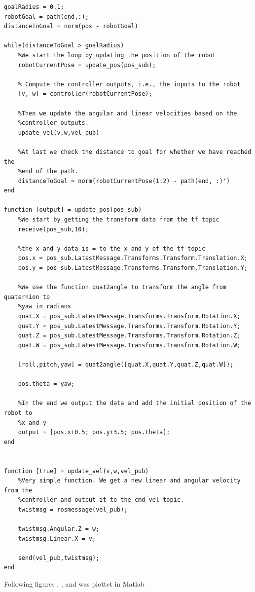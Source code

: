 \documentclass[12pt,a4paper]{article}
\begin{document}
\begin{lstlisting}[style=Matlab-editor]
%defining the radius, endpoint and initializing distanceToGoal
goalRadius = 0.1;
robotGoal = path(end,:);
distanceToGoal = norm(pos - robotGoal)

while(distanceToGoal > goalRadius)   
	%We start the loop by updating the position of the robot
	robotCurrentPose = update_pos(pos_sub);
	
	% Compute the controller outputs, i.e., the inputs to the robot
	[v, w] = controller(robotCurrentPose);
	
	%Then we update the angular and linear velocities based on the
	%controller outputs.
	update_vel(v,w,vel_pub)
	
	%At last we check the distance to goal for whether we have reached the
	%end of the path.
	distanceToGoal = norm(robotCurrentPose(1:2) - path(end, :)')
end

function [output] = update_pos(pos_sub)
	%We start by getting the transform data from the tf topic
	receive(pos_sub,10);
	
	%the x and y data is = to the x and y of the tf topic
	pos.x = pos_sub.LatestMessage.Transforms.Transform.Translation.X;
	pos.y = pos_sub.LatestMessage.Transforms.Transform.Translation.Y;
	
	%We use the function quat2angle to transform the angle from quaternion to
	%yaw in radians
	quat.X = pos_sub.LatestMessage.Transforms.Transform.Rotation.X;
	quat.Y = pos_sub.LatestMessage.Transforms.Transform.Rotation.Y;
	quat.Z = pos_sub.LatestMessage.Transforms.Transform.Rotation.Z;
	quat.W = pos_sub.LatestMessage.Transforms.Transform.Rotation.W;
	
	[roll,pitch,yaw] = quat2angle([quat.X,quat.Y,quat.Z,quat.W]);
	
	pos.theta = yaw;
	
	%In the end we output the data and add the initial position of the robot to
	%x and y
	output = [pos.x+0.5; pos.y+3.5; pos.theta];
end


function [true] = update_vel(v,w,vel_pub)
	%Very simple function. We get a new linear and angular velocity from the
	%controller and output it to the cmd_vel topic.
	twistmsg = rosmessage(vel_pub);
	
	twistmsg.Angular.Z = w;
	twistmsg.Linear.X = v;
	
	send(vel_pub,twistmsg);
end\end{lstlisting}
	\noindent %
	Following figures , ,  and  was plottet in Matlab
\end{document}
